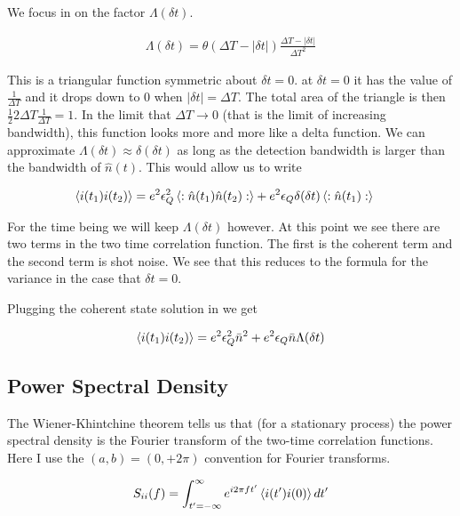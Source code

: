 \documentclass[12pt]{article}
\newcommand{\ep}{\epsilon}
\begin{document}
We focus in on the factor $\Lambda(\delta t)$. 

\begin{align}
\Lambda(\delta t) = \theta(\Delta T - |\delta t|)\frac{\Delta T-|\delta t|}{\Delta T^2}
\end{align}

This is a triangular function symmetric about $\delta t=0$. at $\delta t=0$ it has the value of $\frac{1}{\Delta T}$ and it drops down to 0 when $|\delta t| = \Delta T$. The total area of the triangle is then $\frac{1}{2} 2\Delta T \frac{1}{\Delta T} = 1$. In the limit that $\Delta T \rightarrow 0$ (that is the limit of increasing bandwidth), this function looks more and more like a delta function. We can approximate $\Lambda(\delta t) \approx \delta(\delta t)$ as long as the detection bandwidth is larger than the bandwidth of $\hat{n}(t)$. This would allow us to write

\begin{align}
\Braket{i(t_1)i(t_2)} &=e^2 \ep_Q^2 \Braket{:\hat{n}(t_1)\hat{n}(t_2):} + e^2 \ep_Q \delta(\delta t) \braket{:\hat{n}(t_1):}
\end{align}

For the time being we will keep $\Lambda(\delta t)$ however. At this point we see there are two terms in the two time correlation function. The first is the coherent term and the second term is shot noise. We see that this reduces to the formula for the variance in the case that $\delta t=0$.

Plugging the coherent state solution in we get

\begin{align}
\braket{i(t_1)i(t_2)} = e^2 \ep_Q^2 \bar{n}^2 + e^2 \ep_Q \bar{n} \Lambda(\delta t)
\end{align}

\subsection{Power Spectral Density}

The Wiener-Khintchine theorem tells us that (for a stationary process) the power spectral density is the Fourier transform of the two-time correlation functions. Here I use the $(a,b) = (0,+2\pi)$ convention for Fourier transforms.

\begin{align}
S_{ii}(f) = \int_{t'=-\infty}^{\infty} e^{i2\pi f t'} \Braket{i(t')i(0)} dt'
\end{align}
\end{document}
